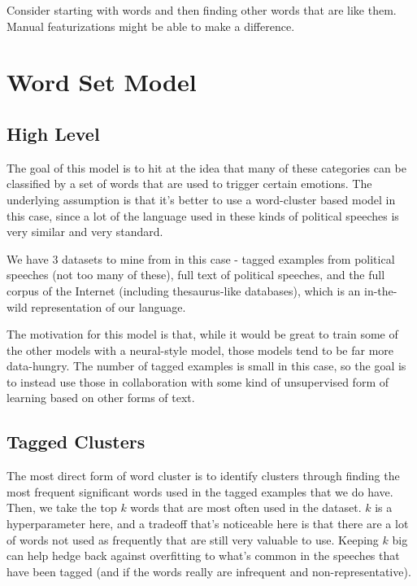 \documentclass[letterpaper]{article}
\begin{document}
Consider starting with words and then finding other words that are like them. Manual featurizations might be able to make a difference.
\section*{Word Set Model}
\subsection*{High Level}
The goal of this model is to hit at the idea that many of these categories can be classified by a set of words that are used to trigger certain emotions. The underlying assumption is that it's better to use a word-cluster based model in this case, since a lot of the language used in these kinds of political speeches is very similar and very standard.

We have 3 datasets to mine from in this case - tagged examples from political speeches (not too many of these), full text of political speeches, and the full corpus of the Internet (including thesaurus-like databases), which is an in-the-wild representation of our language.

The motivation for this model is that, while it would be great to train some of the other models with a neural-style model, those models tend to be far more data-hungry. The number of tagged examples is small in this case, so the goal is to instead use those in collaboration with some kind of unsupervised form of learning based on other forms of text.

\subsection*{Tagged Clusters}
The most direct form of word cluster is to identify clusters through finding the most frequent significant words used in the tagged examples that we do have. Then, we take the top $k$ words that are most often used in the dataset. $k$ is a hyperparameter here, and a tradeoff that's noticeable here is that there are a lot of words not used as frequently that are still very valuable to use. Keeping $k$ big can help hedge back against overfitting to what's common in the speeches that have been tagged (and if the words really are infrequent and non-representative).
\end{document}
